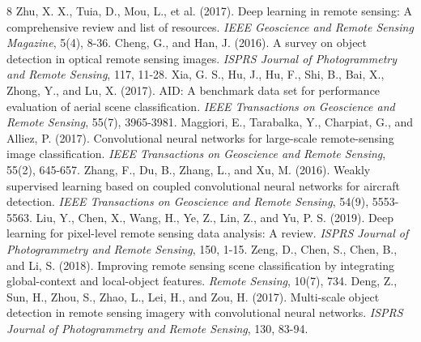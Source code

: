 \documentclass[12pt,a4paper]{article}
\begin{document}

\begin{thebibliography}{8}
 Zhu, X. X., Tuia, D., Mou, L., et al. (2017). Deep learning in remote sensing: A comprehensive review and list of resources. \emph{IEEE Geoscience and Remote Sensing Magazine}, 5(4), 8-36.
 Cheng, G., and Han, J. (2016). A survey on object detection in optical remote sensing images. \emph{ISPRS Journal of Photogrammetry and Remote Sensing}, 117, 11-28.
 Xia, G. S., Hu, J., Hu, F., Shi, B., Bai, X., Zhong, Y., and Lu, X. (2017). AID: A benchmark data set for performance evaluation of aerial scene classification. \emph{IEEE Transactions on Geoscience and Remote Sensing}, 55(7), 3965-3981.
 Maggiori, E., Tarabalka, Y., Charpiat, G., and Alliez, P. (2017). Convolutional neural networks for large-scale remote-sensing image classification. \emph{IEEE Transactions on Geoscience and Remote Sensing}, 55(2), 645-657.
 Zhang, F., Du, B., Zhang, L., and Xu, M. (2016). Weakly supervised learning based on coupled convolutional neural networks for aircraft detection. \emph{IEEE Transactions on Geoscience and Remote Sensing}, 54(9), 5553-5563.
 Liu, Y., Chen, X., Wang, H., Ye, Z., Lin, Z., and Yu, P. S. (2019). Deep learning for pixel-level remote sensing data analysis: A review. \emph{ISPRS Journal of Photogrammetry and Remote Sensing}, 150, 1-15.
 Zeng, D., Chen, S., Chen, B., and Li, S. (2018). Improving remote sensing scene classification by integrating global-context and local-object features. \emph{Remote Sensing}, 10(7), 734.
 Deng, Z., Sun, H., Zhou, S., Zhao, L., Lei, H., and Zou, H. (2017). Multi-scale object detection in remote sensing imagery with convolutional neural networks. \emph{ISPRS Journal of Photogrammetry and Remote Sensing}, 130, 83-94.
\end{thebibliography}
\end{document}

